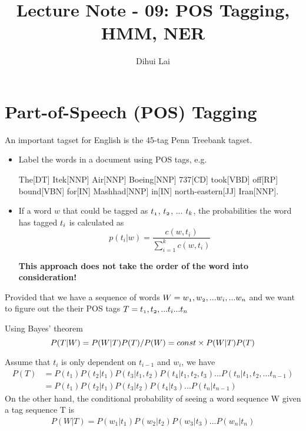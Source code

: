 \documentclass[12pt, oneside]{article}
\title{Lecture Note - 09: POS Tagging, HMM, NER}
\author{Dihui Lai}
\begin{document}
\maketitle
\tableofcontents

\vspace{.25in}

\section{Part-of-Speech (POS) Tagging}


An important tagset for English is the 45-tag Penn Treebank tagset. 

\begin{itemize}
\item Label the words in a document using POS tags, e.g. 

The[DT] Itek[NNP] Air[NNP] Boeing[NNP] 737[CD] took[VBD] off[RP] bound[VBN] for[IN] Mashhad[NNP] in[IN] north-eastern[JJ] Iran[NNP].

\item If a word $w$ that could be tagged as $\mathnormal{t_1}$, $\mathnormal{t_2}$, ... $\mathnormal{t_k}$, the probabilities the word has tagged  $\mathnormal{t_i}$ is calculated as
$${p(t_i|w) = \frac{c(w,t_i)}{\sum\limits_{i=1}^{k}c(w, t_i)}}$$

\textbf{This approach does not take the order of the word into consideration!}
\end{itemize}

Provided that we have a sequence of words $\mathnormal{W=w_1, w_2,  ...w_i, ...w_n}$ and we want to figure out the their POS tags $\mathnormal{T= t_1, t_2, ... t_i ...t_n}$

Using Bayes' theorem
$$\mathnormal{P(T | W) = P(W|T) P(T) / P(W) = const \times P(W|T) P(T)}$$

Assume that ${t_i}$ is only dependent on ${t_{i-1}}$ and ${w_{i}}$, we have
\begin{align*}
P(T)&= P(t_1) P(t_2 | t_1) P(t_3 | t_1, t_2) P(t_4 | t_1, t_2, t_3)  ...P(t_n | t_{1}, t_{2}, ... t_{n-1})\\
&=P(t_1) P(t_2 | t_1) P(t_3 | t_2) P(t_4 |  t_3)  ...P(t_n | t_{n-1})
\end{align*}
On the other hand, the conditional probability of seeing a word sequence W given a tag sequence T is 
\begin{align*}
P(W|T) = P(w_1 | t_1) P(w_2 | t_2) P(w_3 | t_3)  ...P(w_n | t_{n})
\end{align*}
\end{document}
